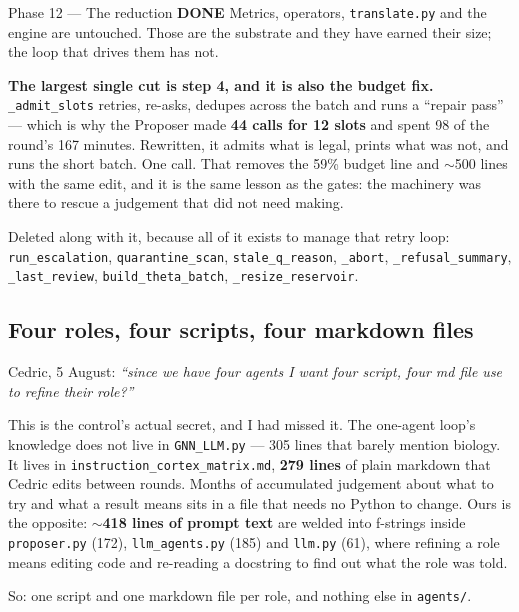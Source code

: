 \documentclass[11pt,a4paper]{article}
\newcommand{\code}[1]{\texttt{#1}}
\newcommand{\done}{\textcolor{good}{\textbf{DONE}}}
\begin{document}
\begin{phasebox}{Phase 12 --- The reduction \hfill \done}
\noindent Metrics, operators, \code{translate.py} and the engine are untouched. Those are the
substrate and they have earned their size; the loop that drives them has not.

\textbf{The largest single cut is step 4, and it is also the budget fix.}
\code{\_admit\_slots} retries, re-asks, dedupes across the batch and runs a ``repair pass'' --- which
is why the Proposer made \textbf{44 calls for 12 slots} and spent 98 of the round's 167 minutes.
Rewritten, it admits what is legal, prints what was not, and runs the short batch. One call. That
removes the 59\% budget line and $\sim$500 lines with the same edit, and it is the same lesson as
the gates: the machinery was there to rescue a judgement that did not need making.

Deleted along with it, because all of it exists to manage that retry loop:
\code{run\_escalation}, \code{quarantine\_scan}, \code{stale\_q\_reason}, \code{\_abort},
\code{\_refusal\_summary}, \code{\_last\_review}, \code{build\_theta\_batch},
\code{\_resize\_reservoir}.

\subsection*{Four roles, four scripts, four markdown files}
Cedric, 5 August: \emph{``since we have four agents I want four script, four md file use to refine
their role?''}

This is the control's actual secret, and I had missed it. The one-agent loop's knowledge does not
live in \code{GNN\_LLM.py} --- 305 lines that barely mention biology. It lives in
\code{instruction\_cortex\_matrix.md}, \textbf{279 lines} of plain markdown that Cedric edits between
rounds. Months of accumulated judgement about what to try and what a result means sits in a file that
needs no Python to change. Ours is the opposite: \textbf{$\sim$418 lines of prompt text} are welded
into f-strings inside \code{proposer.py} (172), \code{llm\_agents.py} (185) and \code{llm.py} (61),
where refining a role means editing code and re-reading a docstring to find out what the role was
told.

So: one script and one markdown file per role, and nothing else in \code{agents/}.


\end{phasebox}
\end{document}
